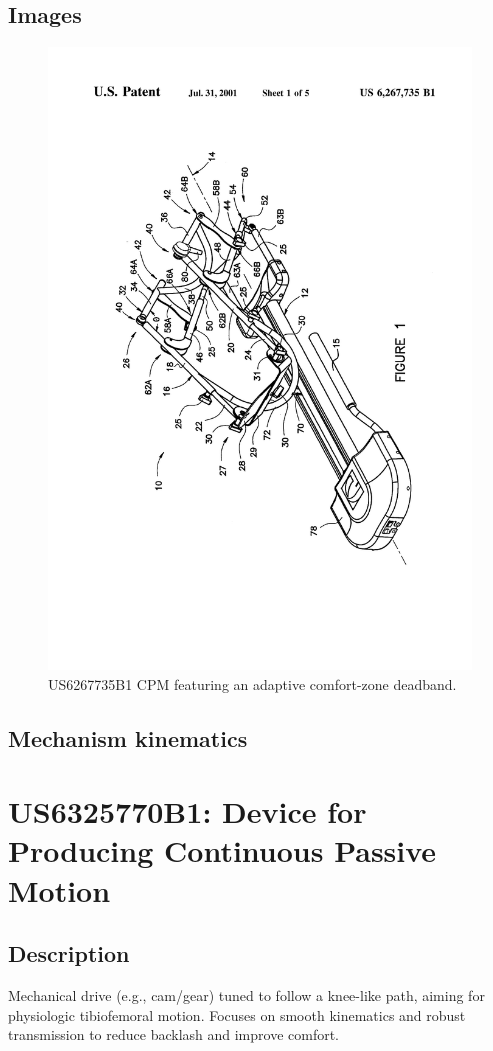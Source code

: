 \documentclass[11pt]{article}
\begin{document}
\subsection{Images}
\begin{figure}[H]
  \centering
  \includegraphics[width=0.54\linewidth, angle=-90]{US6267735B1_1.png}
  \caption{US6267735B1 CPM featuring an adaptive comfort-zone deadband.}
  \label{fig:US6267735B1}
\end{figure}

\subsection{Mechanism kinematics}

\section{US6325770B1: Device for Producing Continuous Passive Motion}
\subsection{Description}
Mechanical drive (e.g., cam/gear) tuned to follow a knee-like path, aiming for physiologic tibiofemoral motion. Focuses on smooth kinematics and robust transmission to reduce backlash and improve comfort.
\end{document}
